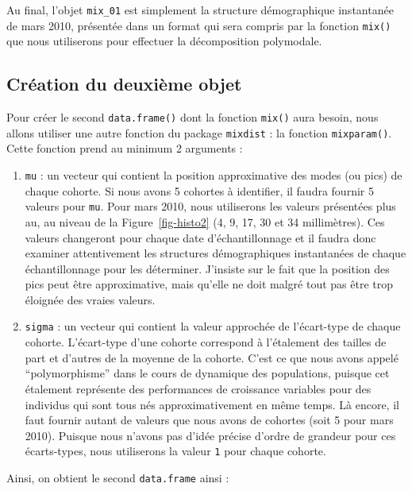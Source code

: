 \documentclass[
  a4paper,
  DIV=11,
  numbers=noendperiod,
  oneside]{scrreprt}
\providecommand{\tightlist}{%
  \setlength{\itemsep}{0pt}\setlength{\parskip}{0pt}}\usepackage{longtable,booktabs,array}
\begin{document}
Au final, l'objet \texttt{mix\_01} est simplement la structure
démographique instantanée de mars 2010, présentée dans un format qui
sera compris par la fonction \texttt{mix()} que nous utiliserons pour
effectuer la décomposition polymodale.

\hypertarget{cruxe9ation-du-deuxiuxe8me-objet}{%
\subsection{Création du deuxième
objet}\label{cruxe9ation-du-deuxiuxe8me-objet}}

Pour créer le second \texttt{data.frame()} dont la fonction
\texttt{mix()} aura besoin, nous allons utiliser une autre fonction du
package \texttt{mixdist} : la fonction \texttt{mixparam()}. Cette
fonction prend au minimum 2 arguments :

\begin{enumerate}
\def\labelenumi{\arabic{enumi}.}
\tightlist
\item
  \texttt{mu} : un vecteur qui contient la position approximative des
  modes (ou pics) de chaque cohorte. Si nous avons 5 cohortes à
  identifier, il faudra fournir 5 valeurs pour \texttt{mu}. Pour mars
  2010, nous utiliserons les valeurs présentées plus au, au niveau de la
  Figure~\ref{fig-histo2} (4, 9, 17, 30 et 34 millimètres). Ces valeurs
  changeront pour chaque date d'échantillonnage et il faudra donc
  examiner attentivement les structures démographiques instantanées de
  chaque échantillonnage pour les déterminer. J'insiste sur le fait que
  la position des pics peut être approximative, mais qu'elle ne doit
  malgré tout pas être trop éloignée des vraies valeurs.
\item
  \texttt{sigma} : un vecteur qui contient la valeur approchée de
  l'écart-type de chaque cohorte. L'écart-type d'une cohorte correspond
  à l'étalement des tailles de part et d'autres de la moyenne de la
  cohorte. C'est ce que nous avons appelé ``polymorphisme'' dans le
  cours de dynamique des populations, puisque cet étalement représente
  des performances de croissance variables pour des individus qui sont
  tous nés approximativement en même temps. Là encore, il faut fournir
  autant de valeurs que nous avons de cohortes (soit 5 pour mars 2010).
  Puisque nous n'avons pas d'idée précise d'ordre de grandeur pour ces
  écarts-types, nous utiliserons la valeur \texttt{1} pour chaque
  cohorte.
\end{enumerate}

Ainsi, on obtient le second \texttt{data.frame} ainsi :
\end{document}
